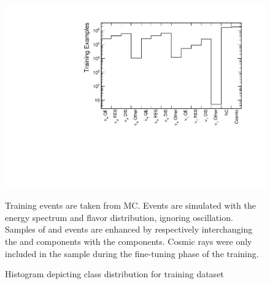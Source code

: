 \begin{figure}[t]
\begin{center}
\includegraphics[width=\textwidth]{figures/cnn/traindist.pdf}
\end{center}
\caption{Histogram depicting class distribution for training dataset}{
  Training events are taken from \nova MC.  Events are simulated with the
  \numi energy spectrum and flavor distribution, ignoring oscillation.
  Samples of \nue and \nutau events are enhanced by respectively interchanging the \nue and \nutau components with the \numu components.
  Cosmic rays were only included in the sample during the fine-tuning phase of
  the training.
}
\label{traindist}
\end{figure}

